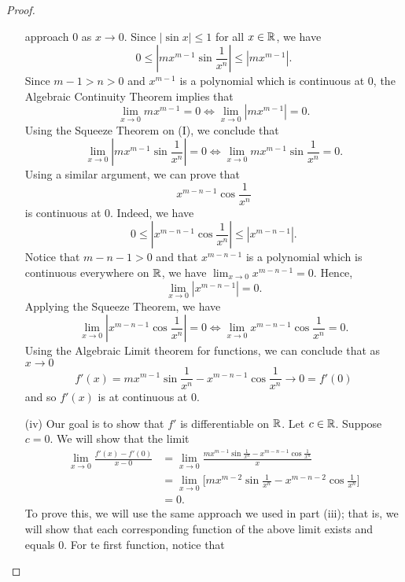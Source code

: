 \documentclass[a4paper]{article}
\begin{document}
\begin{proof}
\begin{enumerate}
        approach \( 0 \) as \( x \to 0  \). Since \( | \sin x  | \leq 1  \) for all \( x \in \mathbb{R}  \), we have  
        \[   0 \leq | m x^{m-1} \sin \frac{ 1 }{ x^{n} }  | \leq | m x^{m-1} |. \tag{I}  \]
        Since \( m - 1 > n > 0  \) and \( x^{m-1} \) is a polynomial which is continuous at \( 0  \), the Algebraic Continuity Theorem implies that 
        \[  \lim_{ x \to 0 }  m x^{m-1} = 0 \iff \lim_{ x \to 0 }  | m x^{m-1} |  = 0.  \]
        Using the Squeeze Theorem on (I), we conclude that 
        \[  \lim_{ x \to 0 }  | m x^{m-1} \sin \frac{ 1 }{ x^{n} }  | = 0 \iff \lim_{ x \to 0 }  m x^{m-1} \sin \frac{ 1 }{ x^{n} } = 0.  \]
        Using a similar argument, we can prove that 
        \[  x^{m-n-1} \cos \frac{ 1 }{ x^{n} } \]
        is continuous at \( 0  \).
        Indeed, we have 
        \[  0 \leq | x^{m-n-1} \cos \frac{ 1 }{ x^{n} }  | \leq | x^{m-n-1} |. \tag{\( | \cos x  | \leq 1  \ \forall x \in \R  \)}  \]
        Notice that \( m - n - 1 > 0  \) and that \( x^{m-n-1}  \) is a polynomial which is continuous everywhere on \( \mathbb{R}  \), we have \( \lim_{ x \to 0 }  x^{m-n-1}  = 0 \). Hence, 
        \[  \lim_{ x \to 0 }  | x^{m-n-1}  |  = 0.  \]
        Applying the Squeeze Theorem, we have 
        \[  \lim_{ x \to 0 } | x^{m-n-1} \cos \frac{ 1 }{ x^{n} }  | = 0 \iff \lim_{ x \to 0 } x^{m-n-1} \cos \frac{ 1 }{ x^{n} } = 0.  \]
        Using the Algebraic Limit theorem for functions, we can conclude that as \( x \to 0  \) 
        \[  f'(x) = m x^{m-1} \sin \frac{ 1 }{ x^{n} }  - x^{m-n-1} \cos \frac{ 1 }{ x^{n} } \to 0  = f'(0) \]
        and so \( f'(x) \) is at continuous at \( 0 \).
    \item[(iv)] Our goal is to show that \( f' \) is differentiable on \( \mathbb{R}  \). Let \( c \in \mathbb{R}  \). Suppose \( c = 0  \). We will show that the limit 
        \begin{align*}
            \lim_{ x \to 0 } \frac{ f'(x) - f'(0) }{  x - 0  }  &= \lim_{ x \to 0 }  \frac{ m x^{m-1} \sin \frac{ 1 }{ x^{n} }  - x^{m-n-1} \cos \frac{ 1 }{ x^{n} }  }{ x  }  \\ 
                                                                &= \lim_{ x \to 0 } \Big[ m x^{m-2} \sin \frac{ 1 }{ x^{n} }  - x^{m-n-2} \cos \frac{ 1 }{ x^{n} } \Big]     \\
                                                                &= 0.
    \end{align*}
    To prove this, we will use the same approach we used in part (iii); that is, we will show that each corresponding function of the above limit exists and equals \( 0  \). For te first function, notice that 

\end{enumerate}
\end{proof}
\end{document}
